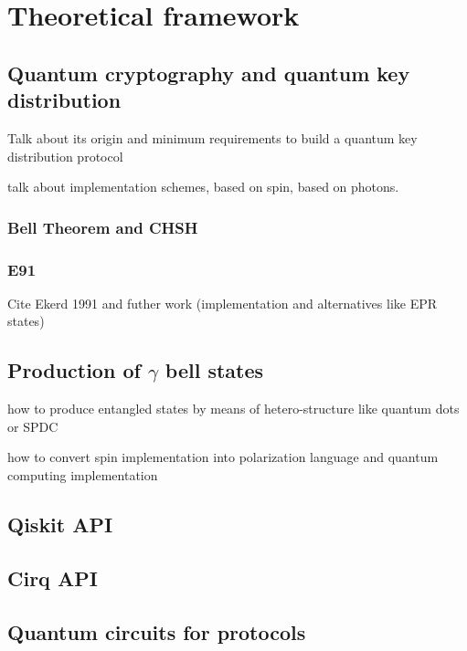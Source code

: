 \section{Theoretical framework}

\subsection{Quantum cryptography and quantum key distribution}

Talk about its origin and minimum requirements to build a quantum key distribution protocol

talk about implementation schemes, based on spin, based on photons.

\subsubsection{Bell Theorem and CHSH}

\subsubsection{E91}

Cite Ekerd 1991 \cite{ekert1991quantum} and futher work (implementation and alternatives like EPR states)

\subsection{Production of $\gamma$ bell states}

how to produce entangled states by means of hetero-structure like quantum dots or SPDC


how to convert spin implementation into polarization language and quantum computing implementation

\subsection{Qiskit API}

\subsection{Cirq API}

\subsection{Quantum circuits for protocols}